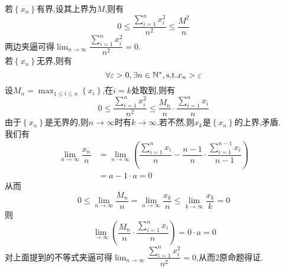 \documentclass[a4paper]{ctexart}
\begin{document}
\begin{solution}[Proof.]
    若$\left\{x_n\right\}$有界,设其上界为$M$,则有
    $$0\leqslant \dfrac{\sum_{i=1}^{n}{x_i^2}}{n^2}\leqslant \dfrac{M^2}{n}$$
    两边夹逼可得$\displaystyle\lim_{n\to\infty}{\dfrac{\sum_{i=1}^{n}{x_i^2}}{n^2}}=0.$\\
    若$\left\{x_n\right\}$无界,则有
    $$\forall\varepsilon>0,\exists n\in\mathbb{N}^*,\text{s.t.} x_n>\varepsilon$$
    设$\displaystyle M_n=\max_{1\leqslant i\leqslant n}\left\{x_i\right\}$,在$i=k$处取到,则有
    $$0\leqslant\dfrac{\sum_{i=1}^{n}{x_i^2}}{n^2}\leqslant\dfrac{M_n}{n}\cdot\dfrac{\sum_{i=1}^{n}{x_i}}{n}$$
    由于$\left\{x_n\right\}$是无界的,则$n\to\infty$时有$k\to\infty$.若不然,则$x_k$是$\left\{x_n\right\}$的上界,矛盾.\\
    我们有
    \begin{align*}
        \lim_{n\to\infty}{\dfrac{x_n}{n}} 
        &= \lim_{n\to\infty}{\left(\dfrac{\sum_{i=1}^{n}{x_i}}{n}-\dfrac{n-1}{n}\cdot\dfrac{\sum_{i=1}^{n-1}{x_i}}{n-1}\right)} \\\
        &= a-1\cdot a= 0
    \end{align*}
    从而$$0\leqslant \lim_{n\to\infty}{\dfrac{M_n}{n}}=\lim_{n\to\infty}{\dfrac{x_k}{n}}\leqslant\lim_{k\to\infty}{\dfrac{x_k}{k}}=0$$
    则$$\lim_{\to\infty}{\left(\dfrac{M_n}{n}\cdot\dfrac{\sum_{i=1}^{n}{x_i}}{n}\right)}=0\cdot a=0$$
    对上面提到的不等式夹逼可得$\displaystyle\lim_{n\to\infty}{\dfrac{\sum_{i=1}^{n}{x_i^2}}{n^2}}=0$,从而2原命题得证.
\end{solution}
\end{document}
